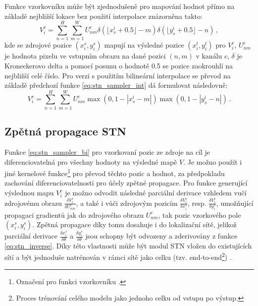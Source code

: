 Funkce vzorkovníku může být zjednodušeně pro mapování hodnot přímo na základě nejbližší lokace bez použití interpolace znázorněna takto:
\begin{equation}
    V_i^c = \sum_{n=1}^{H} \sum_{m=1}^{W} U_{nm}^c \delta(\lfloor x_s^i + 0.5 \rfloor - m) \delta(\lfloor y_s^i + 0.5 \rfloor - n)\,,
\label{eq:stn_sampler_int}
\end{equation}
kde se zdrojové pozice $(x_i^s, y_i^s)$ mapují na výsledné pozice $(x_i^t, y_i^t)$ pro $V_i^c$, $U_{nm}^c$ je hodnota pixelu ve vstupním obrazu na dané pozici $(n, m)$ v kanálu $c$, $\delta$ je Kroneckerovo delta a pomocí posunu o hodnotě 0.5 se pozice zaokrouhlí na nejbližší celé číslo. Pro verzi s použitím bilineární interpolace se převod na základě předchozí funkce \ref{eq:stn_sampler_int} dá formulovat následovně:
\begin{equation}
    V_i^c = \sum_{n=1}^{H} \sum_{m=1}^{W} U_{nm}^c \max(0, 1 - |x_s^i - m|) \max(0, 1 - |y_s^i - n|)\,.
\label{eq:stn_sampler_bi}
\end{equation}

\subsection{Zpětná propagace STN}

Funkce \ref{eq:stn_sampler_bi} pro vzorkovaní pozic ze zdroje na cíl je diferenciovatelná pro všechny hodnoty na výsledné mapě $V$. Je možno použít i jiné kernelové funkce\footnote{Označení pro funkci vzorkovníku \cite{stn}.} pro převod těchto pozic a hodnot, za předpokladu zachování diferenciovatelnosti pro účely zpětné propagace. Pro funkce generující výslednou mapu $V_i^c$ je možno odvodit následné parciální derivace vzhledem vučí zdrojovému obrazu $\frac{\delta V_i^c}{\delta U_{nm}^c}$, a také i vůči zdrojovým pozicím $\frac{\delta V_i^c}{\delta x_i^s}$, resp. $\frac{\delta V_i^c}{\delta y_i^s}$, umožňující propagaci gradientů jak do zdrojového obrazu $U_{nm}^c$, tak pozic vzorkového pole $(x_i^s, y_i^s)$. Zpětná propagace díky tomu dosahuje i do lokalizační sítě, jelikož parciální derivace $\frac{\delta x_i^s}{\delta \theta}$ a $\frac{\delta y_i^s}{\delta \theta}$ jsou schopny být odvozeny a zderivovány z funkce \ref{eq:stn_inverse}. Díky této vlastnosti může být modul STN vložen do existujících sítí a být jednoduše natrénován v rámci sítě jako celku (tzv. end-to-end\footnote{Proces trénování celého modelu jako jednoho celku od vstupu po výstup.}) \cite{stn}. 
\endinput